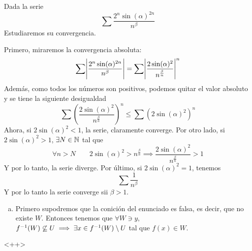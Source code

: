 \documentclass[a4paper]{article}
\begin{document}
Dada la serie
\[
    \sum \frac{2^n \sin(\alpha)^{2n}}{n^\beta}
\]
Estudiaremos su convergencia.

Primero, miraremos la convergencia absoluta:
\[
    \sum \abs{\frac{2^n \sin(\alpha)^{2n}}{n^\beta}} =
    \sum \abs{\frac{2 \sin(\alpha)^2}{n^{\frac{\beta}{n}}}}^n 
\]
Además, como todos los números son positivos, podemos quitar el valor absoluto y 
se tiene la siguiente desigualdad
\[
    \sum \left( \frac{2 \sin(\alpha)^2}{n^{\frac{\beta}{n}}} \right)^n \leq
    \sum \left( 2 \sin(\alpha)^2 \right)^n
\]
Ahora, si $2 \sin(\alpha)^2 < 1$, la serie, claramente converge. Por otro lado, si
$2 \sin(\alpha)^2 > 1$, $\exists N \in \mathbb{N}$ tal que
\[
    \forall n > N \qquad 2 \sin(\alpha)^2 > n^{\frac{\beta}{n}} \implies
    \frac{2 \sin(\alpha)^2}{n^{\frac{\beta}{n}}} > 1
\]
Y por lo tanto, la serie diverge. Por último, si $2 \sin(\alpha)^2 = 1$, tenemos
\[
    \sum \frac{1}{n^\beta}
\]
Y por lo tanto la serie converge sii $\beta > 1$.

\newpage

\begin{enumerate}[a)]
    \item Primero supodremos que la conición del enunciado es falsa, es decir, que no existe $W$. Entonces
        tenemos que $\forall W \ni y$, $f^{-1}(W) \not\subseteq U \implies \exists x \in f^{-1}(W) \setminus U$
        tal que $f(x) \in W$.
\end{enumerate}<++>
\end{document}

